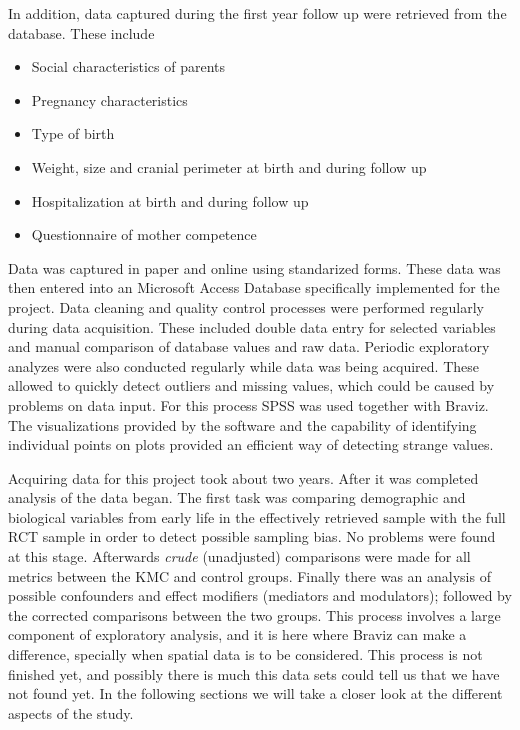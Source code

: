 In addition, data captured during the first year follow up were retrieved from the database. These include

\begin{itemize}
\item Social characteristics of parents
\item Pregnancy characteristics 
\item Type of birth
\item Weight, size and cranial perimeter at birth and during follow up
\item Hospitalization at birth and during follow up
\item Questionnaire of mother competence
\end{itemize}

Data was captured in paper and online using standarized forms. These data was then entered into an Microsoft Access Database specifically implemented for the project. Data cleaning and quality control processes were performed regularly during data acquisition. These included double data entry for selected variables and manual comparison of database values and raw data. Periodic exploratory analyzes were also conducted regularly while data was being acquired. These allowed to quickly detect outliers and missing values, which could be caused by problems on data input. For this process SPSS was used together with Braviz. The visualizations provided by the software and the capability of identifying individual points on plots provided an efficient way of detecting strange values.

Acquiring data for this project took about two years. After it was completed analysis of the data began. The first task was comparing demographic and biological variables from early life in the effectively retrieved sample with the full RCT sample in order to detect possible sampling bias. No problems were found at this stage. Afterwards \emph{crude} (unadjusted) comparisons were made for all metrics between the KMC and control groups. Finally there was an analysis of possible confounders and effect modifiers (mediators and modulators); followed by the corrected comparisons between the two groups. This process involves a large component of exploratory analysis, and it is here where Braviz can make a difference, specially when spatial data is to be considered. This process is not finished yet, and possibly there is much this data sets could tell us that we have not found yet. In the following sections we will take a closer look at the different aspects of the study.

